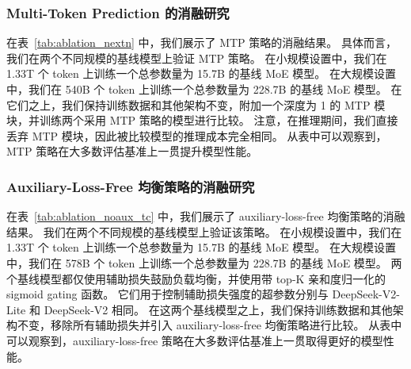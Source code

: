 \documentclass[11pt, a4paper, logo, copyright, nonumbering]{deepseek}
\newcommand{\dsvii}{DeepSeek-V2}
\begin{document}
\subsubsection{Multi-Token Prediction 的消融研究}
\label{discussion:ablation_nextn}

在表~\ref{tab:ablation_nextn} 中，我们展示了 MTP 策略的消融结果。
具体而言，我们在两个不同规模的基线模型上验证 MTP 策略。
在小规模设置中，我们在 1.33T 个 token 上训练一个总参数量为 15.7B 的基线 MoE 模型。
在大规模设置中，我们在 540B 个 token 上训练一个总参数量为 228.7B 的基线 MoE 模型。
在它们之上，我们保持训练数据和其他架构不变，附加一个深度为 1 的 MTP 模块，并训练两个采用 MTP 策略的模型进行比较。
注意，在推理期间，我们直接丢弃 MTP 模块，因此被比较模型的推理成本完全相同。
从表中可以观察到，MTP 策略在大多数评估基准上一贯提升模型性能。

\subsubsection{Auxiliary-Loss-Free 均衡策略的消融研究}
\label{discussion:ablation_noaux_tc}

在表~\ref{tab:ablation_noaux_tc} 中，我们展示了 auxiliary-loss-free 均衡策略的消融结果。
我们在两个不同规模的基线模型上验证该策略。
在小规模设置中，我们在 1.33T 个 token 上训练一个总参数量为 15.7B 的基线 MoE 模型。
在大规模设置中，我们在 578B 个 token 上训练一个总参数量为 228.7B 的基线 MoE 模型。
两个基线模型都仅使用辅助损失鼓励负载均衡，并使用带 top-K 亲和度归一化的 sigmoid gating 函数。
它们用于控制辅助损失强度的超参数分别与 \dsvii{}-Lite 和 \dsvii{} 相同。
在这两个基线模型之上，我们保持训练数据和其他架构不变，移除所有辅助损失并引入 auxiliary-loss-free 均衡策略进行比较。
从表中可以观察到，auxiliary-loss-free 策略在大多数评估基准上一贯取得更好的模型性能。
\end{document}
